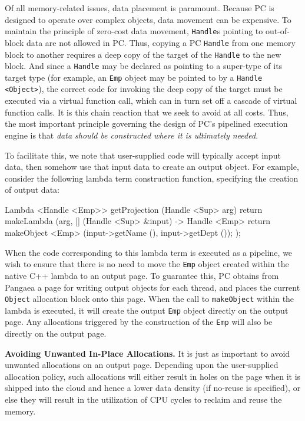 Of all memory-related issues,  
data placement is paramount.  Because PC is designed to operate over
complex objects, data movement can be 
expensive.  To maintain the principle of
zero-cost data movement, \texttt{Handle}s pointing to out-of-block data are not allowed in PC.
Thus, copying a PC \texttt{Handle} from one memory block to another requires a deep copy of the target of the \texttt{Handle} to the new block.  
And since a
\texttt{Handle} may be declared as pointing to a super-type of its
target type (for example, an \texttt{Emp} object may be pointed to by a \texttt{Handle <Object>}), the correct code for invoking the deep copy of the
target must be executed via a virtual 
function call, which can in turn set off a cascade of virtual function calls. It is this chain reaction that we seek to avoid at all costs.
Thus, the most important principle governing the 
design of PC's pipelined execution engine is that \emph{data should be constructed where it is ultimately needed}.

To facilitate this, we note that user-supplied code will typically accept input data, then somehow use that input data to
create an output object.  For example, consider 
the following lambda term construction function, specifying the creation of output data:

\begin{codesmall}
Lambda <Handle <Emp>> getProjection (Handle <Sup> arg) {
        return makeLambda (arg, [] (Handle <Sup> &input) -> Handle <Emp> {
		return makeObject <Emp> (input->getName (), input->getDept ());
	});}
\end{codesmall}

\noindent
When the code corresponding to this lambda term is executed as a pipeline,
we wish to ensure that there is no need to move the \texttt{Emp} object created within the native C++ lambda to an output page.
To guarantee this,
PC obtains from Pangaea a page for writing output objects for each thread, and places the current \texttt{Object} allocation block
onto this page. 
When the call to \texttt{makeObject} within the lambda is executed, it will create the output \texttt{Emp} object
directly on the output page.  Any allocations triggered by the construction of the \texttt{Emp} will also be directly on the output page.

\vspace{5 pt}
\noindent
\textbf{Avoiding Unwanted In-Place Allocations.}
It is just as important to avoid unwanted allocations on an output page.  Depending upon the user-supplied
allocation policy, such allocations will either result
in holes on the page when it is shipped into the cloud and hence a lower data density (if no-reuse is specified), 
or else they will result in the utilization of CPU cycles to 
reclaim and reuse the memory. 

